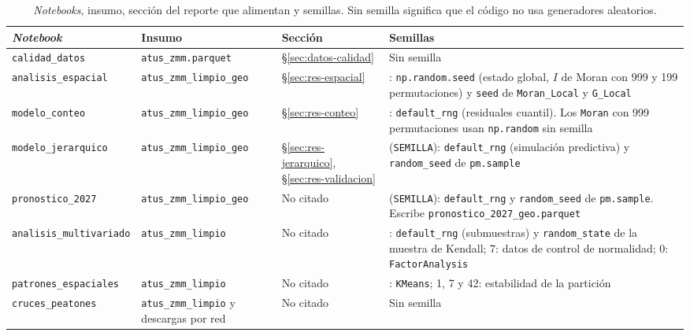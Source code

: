 \begin{table}
	\centering\footnotesize
	\caption{\emph{Notebooks}, insumo, sección del reporte que alimentan y
		semillas. Sin semilla significa que el código no usa generadores aleatorios.}
	\label{tab:notebooks}
	\begin{tabular}{@{}>{\raggedright\arraybackslash}p{}>{\raggedright\arraybackslash}p{}>{\raggedright\arraybackslash}p{}>{\raggedright\arraybackslash}p{}@{}}
		\toprule
		\emph{Notebook} & Insumo & Sección & Semillas \\
		\midrule
		\texttt{calidad\_datos} & \texttt{atus\_zmm.parquet} & §\ref{sec:datos-calidad} & Sin semilla \\
		\addlinespace
		\texttt{analisis\_espacial} & \texttt{atus\_zmm\_limpio\_geo} & §\ref{sec:res-espacial}
		& 42: \texttt{np.random.seed} (estado global, $I$ de Moran con 999 y 199
		permutaciones) y \texttt{seed} de \texttt{Moran\_Local} y \texttt{G\_Local} \\
		\addlinespace
		\texttt{modelo\_conteo} & \texttt{atus\_zmm\_limpio\_geo} & §\ref{sec:res-conteo}
		& 42: \texttt{default\_rng} (residuales cuantil). Los \texttt{Moran} con 999
		permutaciones usan \texttt{np.random} sin semilla \\
		\addlinespace
		\texttt{modelo\_jerarquico} & \texttt{atus\_zmm\_limpio\_geo} & §\ref{sec:res-jerarquico},
		§\ref{sec:res-validacion}
		& 42 (\texttt{SEMILLA}): \texttt{default\_rng} (simulación predictiva) y
		\texttt{random\_seed} de \texttt{pm.sample} \\
		\addlinespace
		\texttt{pronostico\_2027} & \texttt{atus\_zmm\_limpio\_geo} & No citado
		& 42 (\texttt{SEMILLA}): \texttt{default\_rng} y \texttt{random\_seed} de
		\texttt{pm.sample}. Escribe \texttt{pronostico\_2027\_geo.parquet} \\
		\addlinespace
		\texttt{analisis\_multivariado} & \texttt{atus\_zmm\_limpio} & No citado
		& 20260915: \texttt{default\_rng} (submuestras) y \texttt{random\_state} de la
		muestra de Kendall; 7: datos de control de normalidad; 0:
		\texttt{FactorAnalysis} \\
		\addlinespace
		\texttt{patrones\_espaciales} & \texttt{atus\_zmm\_limpio} & No citado
		& 0: \texttt{KMeans}; 1, 7 y 42: estabilidad de la partición \\
		\addlinespace
		\texttt{cruces\_peatones} & \texttt{atus\_zmm\_limpio} y descargas por red & No citado
		& Sin semilla \\
		\bottomrule
	\end{tabular}
\end{table}

